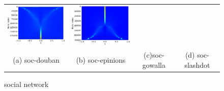 \documentclass[senior,final,11pt]{iscs-thesis}
\begin{document}
\begin{figure}[htbp]
\begin{tabular}{cccc}
    \includegraphics[width=45mm]{figure/soc-gowallamtx_pdos.png} &
    \includegraphics[width=45mm]{figure/soc-slashdotmtx_pdos.png} \\
    (a) soc-douban & (b) soc-epinions & (c)soc-gowalla  & (d) soc-slashdot\\ [6pt]
  \end{tabular}
  \caption{ social network }
  \label{fig:social}
\end{figure}
\end{document}
